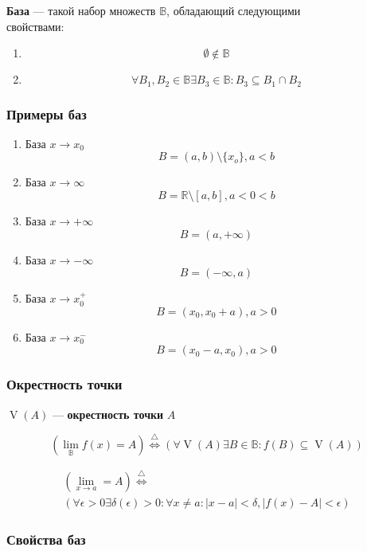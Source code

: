 \documentclass{article}
\DeclareMathOperator*{\V}{V}
\begin{document}
\textbf{База} --- такой набор множеств $\mathbb{B}$, обладающий следующими \\
свойствами:

\begin{enumerate}
	\item \[ \emptyset \not \in \mathbb{B} \]
	\item \[ \forall B_1, B_2 \in \mathbb{B} \exists B_3 \in \mathbb{B} : B_3 \subseteq B_1 \cap B_2 \]
\end{enumerate}

\subsubsection{Примеры баз}

\begin{enumerate}
	\item База $x \to x_0$
	\[ B = (a, b) \setminus \{ x_o \}, a < b \]
	\item База $x \to \infty$
	\[ B = \mathbb{R} \setminus [a, b], a < 0 < b \]
	\item База $x \to +\infty$
	\[ B = (a, +\infty) \]
	\item База $x \to -\infty$
	\[ B = (-\infty, a) \]
	\item База $x \to x_0^{+}$
	\[ B = (x_0, x_0 + a), a > 0 \]
	\item База $x \to x_0^{-}$
	\[ B = (x_0 - a, x_0), a > 0 \]
\end{enumerate}

\subsubsection{Окрестность точки}

$\V(A)$ --- \textbf{окрестность точки} $A$

\[ (\lim_{\mathbb{B}} f(x) = A) \stackrel{\triangle}{\Leftrightarrow}
(\forall \V(A) \exists B \in \mathbb{B} : f(B) \subseteq \V(A)) \]

\begin{gather*}
	(\lim_{x \to a} = A) \stackrel{\triangle}{\Leftrightarrow} \\
	(\forall \epsilon > 0 \exists \delta(\epsilon) > 0 : \forall x \ne a : |x - a| < \delta, |f(x) - A| < \epsilon)
\end{gather*}

\subsubsection{Свойства баз}
\end{document}
